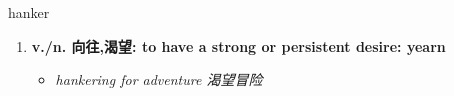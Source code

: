 
\begin{frame}
{\huge hanker}
\begin{center}
\begin{enumerate}\Large
  \item \textbf{v./n. 向往,渴望: to have a strong or persistent desire: yearn}
  \begin{itemize}
    \item \em{\Large{hankering for adventure 渴望冒险}}
  \end{itemize}
\end{enumerate}
\end{center}
\end{frame}
